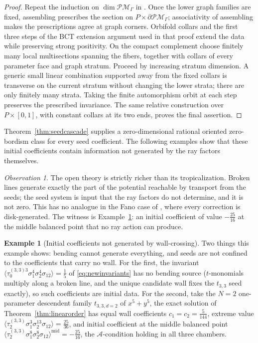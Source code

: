 \documentclass[11pt]{amsart}
\theoremstyle{definition}
\newtheorem{example}[theorem]{Example}
\theoremstyle{remark}
\newtheorem{observation}[theorem]{Observation}
\newcommand{\Ascr}{\mathcal{A}}
\begin{document}
\begin{proof}
Repeat the induction on $\dim\mathcal{PM}_\Gamma$ in
\cite[Lem.~3.40]{GKT}.  Once the lower graph families are fixed, assembling
prescribes the section on
$P\times\partial\mathcal{PM}_\Gamma$; associativity of assembling
\cite[\S2.3.2]{GKT} makes the prescriptions agree at graph corners.
Orbifold collars and the first three steps of the BCT extension argument used
in that proof extend the data while preserving strong positivity.
On the compact complement choose finitely many local multisections spanning
the fibers, together with collars of every parameter face and graph stratum.
Proceed by increasing stratum dimension.  A generic small linear combination
supported away from the fixed collars is transverse on the current stratum
without changing the lower strata; there are only finitely many strata.
Taking the finite automorphism orbit at each step preserves the prescribed
invariance.  The same relative construction over $P\times[0,1]$, with constant
collars at its two ends, proves the final assertion. \qedhere
\end{proof}


Theorem~\ref{thm:seedcascade} supplies a zero-dimensional rational oriented
zero-bordism class for every seed coefficient.  The following examples show
that these initial coefficients contain information not generated by the ray
factors themselves.
\begin{observation}
\label{obs:richer}
The open theory is strictly richer than its tropicalization. Broken lines generate
exactly the part of the potential reachable by transport from the seeds; the seed
system is input that the
ray factors do not determine, and it is not zero. This has no analogue in the Fano
case of \cite{Gross10,CPS}, where every correction is disk-generated. The witness is
Example~\ref{ex:middleseeds}: an initial coefficient of value
$-\tfrac{25}{16}$ at the middle balanced point that no ray action can produce.
\end{observation}

\begin{example}[Initial coefficients not generated by wall-crossing]
\label{ex:middleseeds}
Two things this example shows: bending cannot generate everything, and seeds are
not confined to the coefficients that carry no wall. For the first, the invariant
$\langle\tau_{0}^{(3,3)3}\sigma_{1}^{4}\sigma_{2}^{4}\sigma_{12}\rangle
=\tfrac15$ of \eqref{eq:newinvariants} has no bending source ($t$-monomials
multiply along a broken line, and the unique candidate wall fixes the
$t_{3,3}$ seed exactly), so such coefficients are initial data. For the
second, take the $N=2$ one-parameter descendent family $t_{3,3,d=2}$ of
$x^{5}+y^{5}$, the exact solution of Theorem~\ref{thm:linearorder} has equal
wall coefficients $c_{1}=c_{2}=\tfrac5{144}$, extreme value
$\langle\tau_{2}^{(3,3)}\sigma_{1}^{3}\sigma_{2}^{13}\sigma_{12}\rangle
=\tfrac{25}{36}$, and initial coefficient at the middle balanced point
$\langle\tau_{2}^{(3,3)}\sigma_{1}^{8}\sigma_{2}^{8}\sigma_{12}
\rangle^{\mathrm{mid}}=-\tfrac{25}{16}$, the $\Ascr$-condition holding in all
three chambers.
\end{example}
\end{document}
